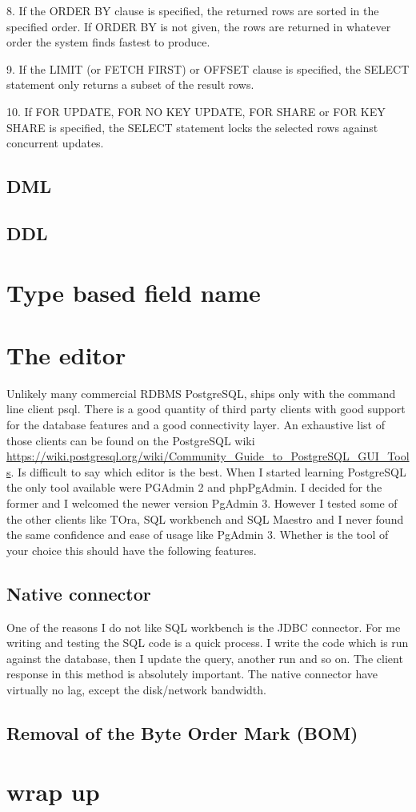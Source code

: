 \begin{smallverbatim}
8. If the ORDER BY clause is specified, the returned rows are sorted in the specified order. 
If ORDER BY is not given, the rows are returned in whatever order the system finds fastest to produce. 


9. If the LIMIT (or FETCH FIRST) or OFFSET clause is specified, the SELECT statement only returns 
a subset of the result rows. 

10. If FOR UPDATE, FOR NO KEY UPDATE, FOR SHARE or FOR KEY SHARE is specified, 
the SELECT statement locks the selected rows against concurrent updates. 

\end{smallverbatim}



\subsection{DML}

\subsection{DDL}

\section{Type based field name}


\section{The editor}
Unlikely many commercial RDBMS PostgreSQL, ships only with the command line client psql. There is a 
good quantity of third party clients with good support for the database features and a good connectivity 
layer. An exhaustive list of those clients can be found on the PostgreSQL wiki\newline
\href{https://wiki.postgresql.org/wiki/Community\_Guide\_to\_PostgreSQL\_GUI\_Tools}{
https://wiki.postgresql.org/wiki/Community\_Guide\_to\_PostgreSQL\_GUI\_Tools}. Is difficult to say 
which editor is the best. When I started learning PostgreSQL the only tool available were PGAdmin 2 and 
phpPgAdmin. I decided for the former and I welcomed the newer version PgAdmin 3. However I tested some of 
the other clients like TOra, SQL workbench and SQL Maestro and I never found the same confidence and ease 
of usage like PgAdmin 3. Whether is the tool of your choice this should have the following features.

\subsection{Native connector}
One of the reasons I do not like SQL workbench is the JDBC connector. For me writing and testing the SQL 
code is a quick process. I write the code which is run against the database, then I update the query, 
another run and so on. The client response in this method is absolutely important. The native connector 
have virtually no lag, except the disk/network bandwidth.

\subsection{Removal of the Byte Order Mark (BOM)} 


\section{wrap up}